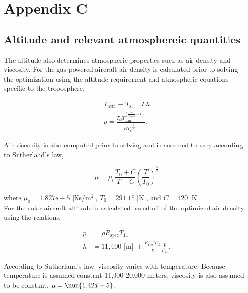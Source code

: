 \section*{Appendix C}

\subsection{Altitude and relevant atmosphereic quantities}

The altitude also determines atmospheric properties such as air density and viscosity.  For the gas powered aircraft air density is calculated prior to solving the optimization using the altitude requirement and atmospheric equations specific to the troposphere,\cite{isaatm} 

\begin{align}
    \label{e:Talt}
    T_{\text{atm}} = T_{\text{sl}} - Lh \\
    \label{e:rhot}
    \rho = \frac{T_{\text{sl}}T_{\text{atm}}^{\left( \frac{g}{R_{\text{spec}}L} -1 \right)}}{R T_{\text{sl}}^{\frac{g}{R_{\text{spec}}L}}}.
\end{align}

Air viscosity is also computed prior to solving and is assumed to vary according to Sutherland's law,\cite{fluiddyhandbook}

\begin{equation}
    \label{e:sutherland}
    \mu = \mu_0 \frac{T_0 + C}{T+C} \left( \frac{T}{T_0} \right)^{\frac{3}{2}}
\end{equation}

where $\mu_0 = 1.827\text{e}-5$ [Ns/m$^2$], $T_0 = 291.15$ [K], and $C = 120$ [K]. \\

For the solar aircraft altitude is calculated based off of the optimized air density using the relations,\cite{isaatm} 

\begin{align}
    \label{e:tropopress}
    p &= \rho R_{\text{spec}}T_{11} \\
    \label{e:tropoalt}
    h &= 11,000 \text{ [m] } + \frac{R_{\text{spec}}T_{11}}{g}\frac{p}{p_{11}}.
\end{align}

According to Sutherland's law\cite{fluiddyhandbook}, viscosity varies with temperature.  Because temperature is assumed constant 11,000-20,000 meters\cite{isaatm}, viscosity is also assumed to be constant, $\mu=\num{1.42d-5}$. \\




